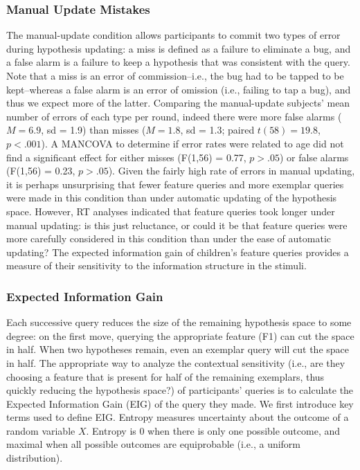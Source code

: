 \documentclass[man,floatsintext]{apa6}
\begin{document}
  

\subsubsection{Manual Update Mistakes}

The manual-update condition allows participants to commit two types of error during 
hypothesis updating: a miss is defined as a failure to eliminate a bug, and a false 
alarm is a failure to keep a hypothesis that was consistent with the query. Note that 
a miss is an error of commission--i.e., the bug had to be tapped to be kept--whereas 
a false alarm is an error of omission (i.e., failing to tap a bug), and thus we expect 
more of the latter. Comparing the manual-update subjects' mean number of errors of 
each type per round, indeed there were more false alarms ($M=6.9$, sd = 1.9) than 
misses ($M=1.8$, sd = 1.3; paired $t(58) = 19.8$, $p<.001$). A MANCOVA to 
determine if error rates were related to age did not find a significant effect for either 
misses (F(1,56) = 0.77, $p>.05$) or false alarms (F(1,56) = 0.23, $p>.05$). Given 
the fairly high rate of errors in manual updating, it is perhaps unsurprising that fewer 
feature queries and more exemplar queries were made in this condition than under 
automatic updating of the hypothesis space. However, RT analyses indicated that 
feature queries took longer under manual updating: is this just reluctance, or could it 
be that feature queries were more carefully considered in this condition than under 
the ease of automatic updating? The expected information gain of children's feature queries provides a measure of their sensitivity to the information structure in the stimuli.

\subsubsection{Expected Information Gain}

Each successive query reduces the size of the remaining hypothesis space to some degree: on the first move, querying the appropriate feature (F1) can cut the space in half. When two hypotheses remain, even an exemplar query will cut the space in half. The appropriate way to analyze the contextual sensitivity (i.e., are they 
choosing a feature that is present for half of the remaining exemplars, thus quickly 
reducing the hypothesis space?) of participants' queries is to calculate the Expected 
Information Gain (EIG) of the query they made. We first introduce key terms used to 
define EIG. Entropy measures uncertainty about the outcome of a random variable 
$X$. Entropy is 0 when there is only one possible outcome, and maximal when all 
possible outcomes are equiprobable (i.e., a uniform distribution).
\end{document}
